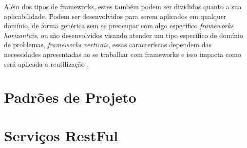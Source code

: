 Além dos tipos de frameworks, estes também podem ser divididos quanto a sua aplicabilidade. Podem ser desenvolvidos para serem aplicados em qualquer domínio, de forma genérica sem se preocupar com algo específico \textit{frameworks horizontais}, ou são desenvolvidos visando atender um tipo específico de domínio de problemas, \textit{frameworks verticais}, essas caracteríscas dependem das necessidades apresentadas ao se trabalhar com frameworks e isso impacta como será aplicada a reutilização \cite{Kroth:2000}.

\section{Padrões de Projeto}

\section{Serviços RestFul}